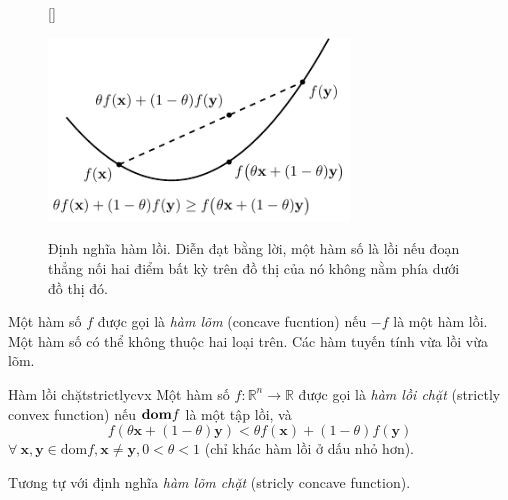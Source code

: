 \begin{figure}[t]
[\FBwidth]
{\caption{Định nghĩa hàm lồi. Diễn đạt bằng lời, một hàm số là lồi nếu đoạn thẳng nối hai điểm bất kỳ trên đồ thị của nó {không nằm phía dưới} đồ thị đó. }
\label{fig:16_convexf_def}}
{\includegraphics[width=8cm]{Chapters/08_ConvexOptimization/16_convexity/latex/convexf_def.pdf}}
\end{figure}



Một hàm số $f$ được gọi là \textit{hàm lõm} (concave fucntion) nếu $-f$
là một hàm lồi. Một
hàm số có thể không thuộc hai loại trên. Các hàm tuyến tính vừa lồi vừa lõm.
\begin{mydef}{Hàm lồi chặt}{strictlycvx}
Một hàm số $f: \mathbb{R}^n \rightarrow \mathbb{R} $ được gọi là
\textit{hàm lồi chặt} ({strictly convex function}) nếu $\boldsymbol{\mathbf{dom}} f$ là một
{tập lồi}, và
\begin{equation*}
f(\theta\mathbf{x} + (1 - \theta) \mathbf{y}) < \theta f(\mathbf{x}) + (1 - \theta)f(\mathbf{y})
\end{equation*}
$\forall~\mathbf{x, y} \in \text{dom}f, \mathbf{x} \neq \mathbf{y},  0 < \theta
< 1$ (chỉ khác hàm lồi ở dấu nhỏ hơn).

\end{mydef}

Tương tự với định nghĩa \textit{hàm lõm chặt} (stricly concave function).

